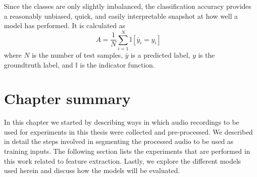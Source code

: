 Since the classes are only slightly imbalanced, the classification accuracy
provides a reasonably unbiased, quick, and easily interpretable snapshot at how
well a model has performed. It is calculated as
\begin{equation}
A = \frac{1}{N}\sum_{i=1}^{N} \mathbb{I}[\bar{y}_i = y_i]
\end{equation}
where $N$ is the number of test samples, $\bar{y}$ is a predicted label, $y$
is the groundtruth label, and $\mathbb{I}$ is the indicator function.

\section{Chapter summary}

In this chapter we started by describing ways in which audio recordings to be
used for experiments in this thesis were collected and pre-processed. We
described in detail the steps involved in segmenting the processed audio to be
used as training inputs. The following section lists the experiments that are
performed in this work related to feature extraction. Lastly, we explore the
different models used herein and discuss how the models will be evaluated.

